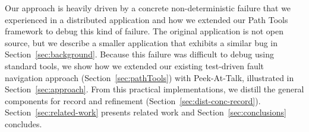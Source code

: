 \documentclass[preprint,3p]{elsarticle}
\newcommand{\toolname}{Peek-At-Talk\xspace}
\begin{document}
Our approach is heavily driven by a concrete non-deterministic failure that we
experienced in a distributed application and how we extended our Path Tools
framework to debug this kind of failure. The original application is not open
source, but we describe a smaller application that exhibits a similar bug in
Section~\ref{sec:background}. Because this failure was difficult to debug using
standard tools, we show how we extended our existing test-driven fault
navigation approach (Section~\ref{sec:pathTools}) with \toolname, illustrated in
Section~\ref{sec:approach}. From this practical implementations, we distill the
general components for record and refinement
(Section~\ref{sec:dist-conc-record}). Section~\ref{sec:related-work} presents
related work and Section~\ref{sec:conclusions} concludes.














\end{document}
